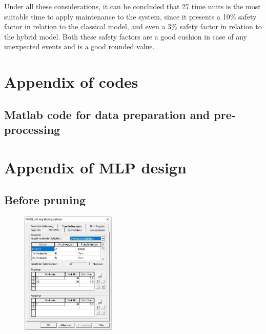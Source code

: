\documentclass{article}
\begin{document}
\begin{doublespacing}
\par Under all these considerations, it can be concluded that 27 time units is the most suitable time to apply maintenance to the system, since it presents a 10\% safety factor in relation to the classical model, and even a 3\% safety factor in relation to the hybrid model. Both these safety factors are a good cushion in case of any unexpected events and is a good rounded value. 












\newpage %
\begin{appendices}

\section{Appendix of codes}
\label{appendix:codes}

\subsection{Matlab code for data preparation and pre-processing}

\label{code:MatLab}



\newpage

\section{Appendix of MLP design}
\label{appendix:steps}
\subsection{Before pruning}

\begin{figure}[H] 
    \centering
    \includegraphics[width=0.40\textwidth]{Images/Photos/ArchWP.JPG} 
\end{figure}


\end{appendices}
\end{doublespacing}
\end{document}
